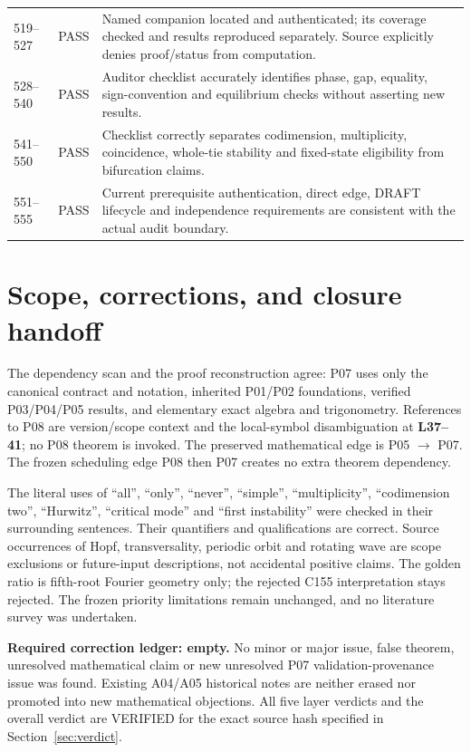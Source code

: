 \documentclass[11pt]{article}
\newcommand{\lin}[1]{\textbf{L#1}}
\begin{document}
\begin{longtable}{@{}L{0.11\textwidth}L{0.10\textwidth}L{0.73\textwidth}@{}}
519--527&PASS&Named companion located and authenticated; its coverage checked and results reproduced separately. Source explicitly denies proof/status from computation.\\
528--540&PASS&Auditor checklist accurately identifies phase, gap, equality, sign-convention and equilibrium checks without asserting new results.\\
541--550&PASS&Checklist correctly separates codimension, multiplicity, coincidence, whole-tie stability and fixed-state eligibility from bifurcation claims.\\
551--555&PASS&Current prerequisite authentication, direct edge, DRAFT lifecycle and independence requirements are consistent with the actual audit boundary.\\
\bottomrule
\end{longtable}
\normalsize

\section{Scope, corrections, and closure handoff}
\label{sec:closure}
The dependency scan and the proof reconstruction agree: P07 uses only
the canonical contract and notation, inherited P01/P02 foundations,
verified P03/P04/P05 results, and elementary exact algebra and
trigonometry. References to P08 are version/scope context and the
local-symbol disambiguation at \lin{37--41}; no P08 theorem is invoked.
The preserved mathematical edge is P05 $\to$ P07. The frozen scheduling
edge P08 then P07 creates no extra theorem dependency.

The literal uses of ``all'', ``only'', ``never'', ``simple'',
``multiplicity'', ``codimension two'', ``Hurwitz'', ``critical mode''
and ``first instability'' were checked in their surrounding sentences.
Their quantifiers and qualifications are correct. Source occurrences
of Hopf, transversality, periodic orbit and rotating wave are scope
exclusions or future-input descriptions, not accidental positive claims.
The golden ratio is fifth-root Fourier geometry only; the rejected C155
interpretation stays rejected. The frozen priority limitations remain
unchanged, and no literature survey was undertaken.

\textbf{Required correction ledger: empty.} No minor or major issue,
false theorem, unresolved mathematical claim or new unresolved P07
validation-provenance issue was found. Existing A04/A05 historical
notes are neither erased nor promoted into new mathematical objections.
All five layer verdicts and the overall verdict are VERIFIED for the
exact source hash specified in Section~\ref{sec:verdict}.
\end{document}
